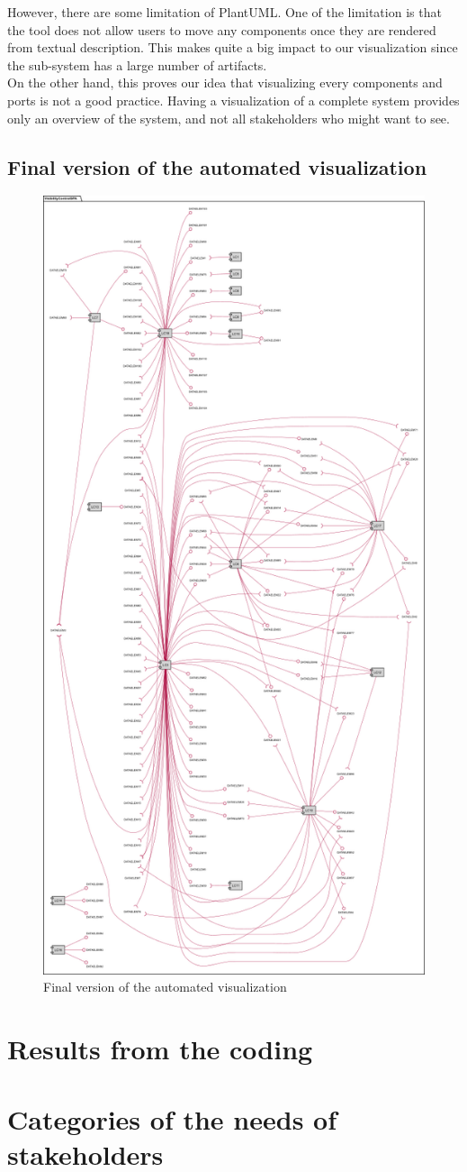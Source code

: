 However, there are some limitation of PlantUML. One of the limitation is that the tool does not allow users to move any components once they are rendered from textual description. This makes quite a big impact to our visualization since the sub-system has a large number of artifacts.\\

On the other hand, this proves our idea that visualizing every components and ports is not a good practice. Having a visualization of a complete system provides only an overview of the system, and not all stakeholders who might want to see.

\subsection{Final version of the automated visualization}
\label{RE:final_version_of_the_automated_visualization}
\begin{figure}[H]
\centering
\captionsetup{justification=centering}
\vspace{0cm}%
\includegraphics[width=0.7\linewidth]{figure/results/visualization_2.png}
\caption{Final version of the automated visualization}
\label{fig:visualization_final}
\end{figure}


\section{Results from the coding}
\label{RE:results_from_the_coding}

\section{Categories of the needs of stakeholders}
